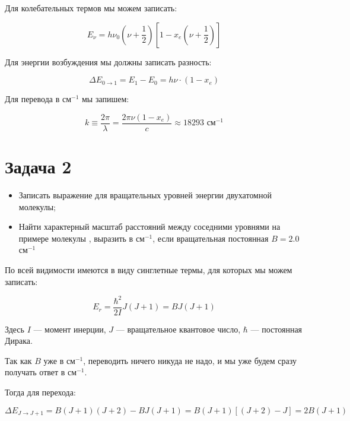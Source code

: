 \documentclass[a4paper, 12pt]{article}
\begin{document}
Для колебательных термов мы можем записать:

\begin{equation}
	E_\nu = h\nu_0 \left(\nu + \frac{1}{2}\right) \left[1 - x_e\left( \nu + \frac{1}{2}\right)\right]
\end{equation}

Для энергии возбуждения мы должны записать разность:

\begin{equation}
	\Delta E_{0\rightarrow1} = E_1 - E_0 = h \nu \cdot (1 - x_e)
\end{equation}

Для перевода в см$^{-1}$ мы запишем:

\begin{equation}
	k \equiv \frac{2\pi}{\lambda} = \frac{2\pi \nu (1 - x_e)}{c} \approx 18293 \text{ см}^{-1}
\end{equation}

\section*{Задача 2}

\begin{itemize}
	\item Записать выражение для вращательных уровней энергии двухатомной молекулы;
	
	\item Найти характерный масштаб расстояний между соседними уровнями на примере молекулы , выразить в см$^{-1}$, если вращательная постоянная $B = 2.0$ см$^{-1}$
\end{itemize}

По всей видимости имеются в виду синглетные термы, для которых мы можем записать:

\begin{equation}
	E_r = \frac{\hbar^2}{2 I} J(J+1) = B J(J+1)
	\label{eq:E_r}
\end{equation}

Здесь $I$ --- момент инерции, $J$ --- вращательное квантовое число, $\hbar$ --- постоянная Дирака.


Так как $B$ уже в см$^{-1}$, переводить ничего никуда не надо, и мы уже будем сразу получать ответ в см$^{-1}$.

Тогда для перехода:

\begin{equation}
	\Delta E_{J\rightarrow J+1} = B(J+1)(J+2) - BJ(J+1) = B(J+1)[(J+2) - J] = 2 B(J + 1)
	\label{eq:transition}
\end{equation}
\end{document}
